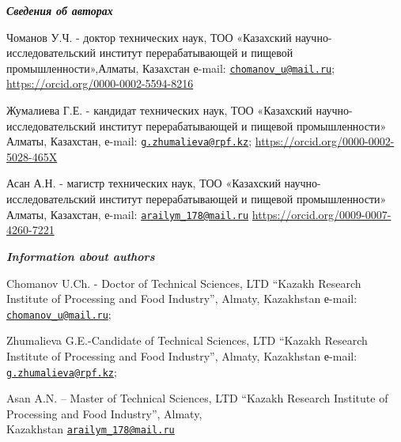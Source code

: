 \begin{authorinfo}
\emph{{\bfseries Сведения об авторах}}

Чоманов У.Ч. - доктор технических наук, ТОО «Казахский
научно-исследовательский институт перерабатывающей и пищевой
промышленности»,Алматы, Казахстан е-mail:
\href{mailto:chomanov_u@mail.ru}{\nolinkurl{chomanov\_u@mail.ru}};
\url{https://orcid.org/0000-0002-5594-8216}

Жумалиева Г.Е. - кандидат технических наук, ТОО «Казахский
научно-исследовательский институт перерабатывающей и пищевой
промышленности» Алматы, Казахстан, е-mail:
\href{mailto:g.zhumalieva@rpf.kz}{\nolinkurl{g.zhumalieva@rpf.kz}};
\url{https://orcid.org/0000-0002-5028-465X}

Асан А.Н. - магистр технических наук, ТОО «Казахский
научно-исследовательский институт перерабатывающей и пищевой
промышленности» Алматы, Казахстан, е-mail:
\href{mailto:arailym_178@mail.ru}{\nolinkurl{arailym\_178@mail.ru}}
\url{https://orcid.org/0009-0007-4260-7221}

\emph{{\bfseries Information about authors}}

Chomanov U.Ch. - Doctor of Technical Sciences, LTD ``Kazakh Research
Institute of Processing and Food Industry'', Almaty, Kazakhstan е-mail:
\href{mailto:chomanov_u@mail.ru}{\nolinkurl{chomanov\_u@mail.ru}};

Zhumalieva G.E.-Candidate of Technical Sciences, LTD ``Kazakh Research
Institute of Processing and Food Industry'', Almaty, Kazakhstan е-mail:
\href{mailto:g.zhumalieva@rpf.kz}{\nolinkurl{g.zhumalieva@rpf.kz}};

Asan A.N. -- Master of Technical Sciences, LTD ``Kazakh Research
Institute of Processing and Food Industry'', Almaty, \\Kazakhstan
\href{mailto:arailym_178@mail.ru}{\nolinkurl{arailym\_178@mail.ru}}\
\end{authorinfo}
